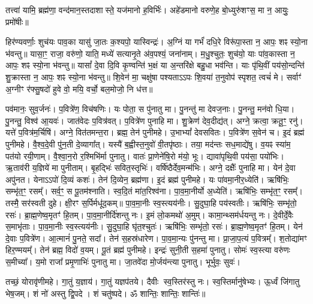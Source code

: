 तत्त्वा॑ यामि॒ ब्रह्म॑णा॒ वन्द॑मान॒स्तदाशास्ते॒ यज॑मानो ह॒विर्भिः॑। 
अहे॑डमानो वरुणे॒ह बो॒ध्युरु॑शꣳस॒ मा न॒ आयुः॒ प्रमो॑षीः॥

हिर॑ण्यवर्णाः॒ शुच॑यः पाव॒का यासु॑ जा॒तः क॒श्यपो॒ यास्विन्द्रः॑।
अ॒ग्निं या गर्भं॑ दधि॒रे विरू॑पा॒स्ता न॒ आपः॒ शꣴ स्यो॒ना भ॑वन्तु॥ 
यासा॒ꣳ॒ राजा॒ वरु॑णो॒ याति॒ मध्ये॑ सत्यानृ॒ते अ॑व॒पश्यं॒ जना॑नाम्।
म॒धु॒श्चुतः॒ शुच॑यो॒ याः पा॑व॒कास्ता न॒ आपः॒ शꣴ स्यो॒ना भ॑वन्तु॥ 
यासां᳚ दे॒वा दि॒वि कृ॒ण्वन्ति॑ भ॒क्षं या अ॒न्तरि॑क्षे बहु॒धा भव॑न्ति।
याः पृ॑थि॒वीं पय॑सो॒न्दन्ति॑ शु॒क्रास्ता न॒ आपः॒ शꣴ स्यो॒ना भ॑वन्तु॥ 
शि॒वेन॑ मा॒ चक्षु॑षा पश्यताऽऽपः शि॒वया॑ त॒नुवोप॑ स्पृशत॒ त्वचं॑ मे।
सर्वाꣳ॑ अ॒ग्नीꣳ र॑फ्सु॒षदो॑ हुवे वो॒ मयि॒ वर्चो॒ बल॒मोजो॒ नि ध॑त्त॥

पव॑मानः॒ सुव॒र्जनः॑। प॒वित्रे॑ण॒ विच॑\ur{}षणिः। यः पोता॒ स पु॑नातु मा। पु॒नन्तु॑ मा देवज॒नाः।
पु॒नन्तु॒ मन॑वो धि॒या। पु॒नन्तु॒ विश्व॑ आ॒यवः॑। जात॑वेदः प॒वित्र॑वत्। प॒वित्रे॑ण पुनाहि मा।
शु॒क्रेण॑ देव॒दीद्य॑त्। अग्ने॒ क्रत्वा॒ क्रतू॒ꣳ॒ रनु॑। यत्ते॑ प॒वित्र॑म॒र्चिषि॑। अग्ने॒ वित॑तमन्त॒रा।
ब्रह्म॒ तेन॑ पुनीमहे। उ॒भाभ्यां᳚ देवसवितः। प॒वित्रे॑ण स॒वेन॑ च। इ॒दं ब्रह्म॑ पुनीमहे।
वै॒श्व॒दे॒वी पु॑न॒ती दे॒व्यागा᳚त्। यस्यै॑ ब॒ह्वीस्त॒नुवो॑ वी॒तपृ॑ष्ठाः।
तया॒ मद॑न्तः सध॒माद्ये॑षु। व॒यꣴ स्या॑म॒ पत॑यो रयी॒णाम्।
वै॒श्वा॒न॒रो र॒श्मिभि॑र्मा पुनातु। वातः॑ प्रा॒णेने॑षि॒रो म॑यो॒ भूः।
द्यावा॑पृथि॒वी पय॑सा॒ पयो॑भिः। ऋ॒ताव॑री य॒ज्ञिये॑ मा पुनीताम्।
बृ॒हद्भिः॑ सवित॒स्तृभिः॑। वर्{}षि॑ष्ठैर्देव॒मन्म॑भिः।
अग्ने॒ दक्षैः᳚ पुनाहि मा। येन॑ दे॒वा अपु॑नत।
येनाऽऽपो॑ दि॒व्यं कशः॑। तेन॑ दि॒व्येन॒ ब्रह्म॑णा। इ॒दं ब्रह्म॑ पुनीमहे। यः पा॑वमा॒नीर॒ध्येति॑।
ऋषि॑भिः॒ सम्भृ॑त॒ꣳ॒ रसम्᳚। सर्व॒ꣳ॒ स पू॒तम॑श्नाति।
स्व॒दि॒तं मा॑त॒रिश्व॑ना। पा॒व॒मा॒नीर्यो अ॒ध्येति॑।
ऋषि॑भिः॒ सम्भृ॑त॒ꣳ॒ रसम्᳚। तस्मै॒ सर॑स्वती दुहे। क्षी॒रꣳ स॒र्पिर्मधू॑द॒कम्॥
पा॒व॒मा॒नीः स्व॒स्त्यय॑नीः। सु॒दुघा॒हि पय॑स्वतीः।
ऋषि॑भिः॒ सम्भृ॑तो॒ रसः॑। ब्रा॒ह्म॒णेष्व॒मृतꣳ॑ हि॒तम्।
पा॒व॒मा॒नीर्दि॑शन्तु नः। इ॒मं लो॒कमथो॑ अ॒मुम्।
कामा॒न्थ्सम॑र्धयन्तु नः। दे॒वीर्दे॒वैः स॒माभृ॑ताः।
पा॒व॒मा॒नीः स्व॒स्त्यय॑नीः। सु॒दुघा॒हि घृ॑त॒श्चुतः॑।
ऋषि॑भिः॒ सम्भृ॑तो॒ रसः॑। ब्रा॒ह्म॒णेष्व॒मृतꣳ॑ हि॒तम्।
येन॑ दे॒वाः प॒वित्रे॑ण। आ॒त्मानं॑ पु॒नते॒ सदा᳚।
तेन॑ स॒हस्र॑धारेण। पा॒व॒मा॒न्यः पु॑नन्तु मा।
प्रा॒जा॒प॒त्यं प॒वित्रम्᳚। श॒तोद्या॑मꣳ हिर॒ण्मयम्᳚।
तेन॑ ब्रह्म॒ विदो॑ व॒यम्। पू॒तं ब्रह्म॑ पुनीमहे।
इन्द्रः॑ सुनी॒ती स॒हमा॑ पुनातु। सोमः॑ स्व॒स्त्या वरु॑णः स॒मीच्या᳚।
य॒मो राजा᳚ प्रमृ॒णाभिः॑ पुनातु मा। जा॒तवे॑दा मो॒र्जय॑न्त्या पुनातु। भूर्भुवः॒ सुवः॑।

तच्छं॒ योरावृ॑णीमहे। गा॒तुं य॒ज्ञाय॑।
गा॒तुं यज्ञप॑तये। दैवीः स्व॒स्तिर॑स्तु नः।
स्व॒स्तिर्मानु॑षेभ्यः। ऊ॒र्ध्वं जि॑गातु भेष॒जम्।
शं नो॑ अस्तु द्वि॒पदे। शं चतु॑ष्पदे।
ॐ शान्तिः॒ शान्तिः॒ शान्तिः॑॥

